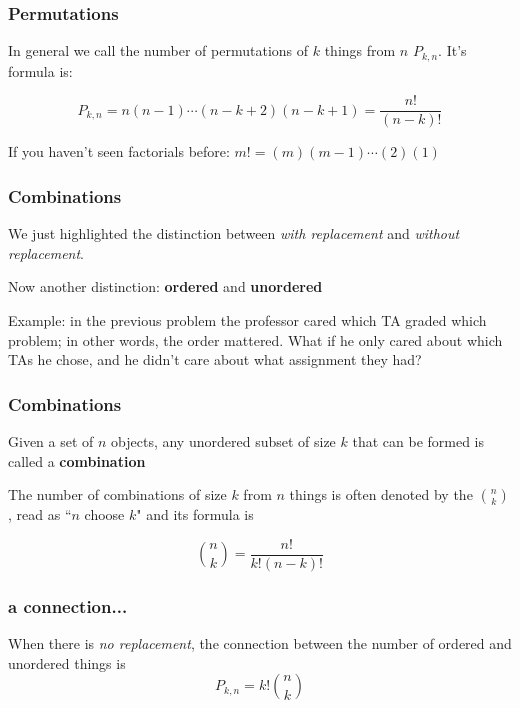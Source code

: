 \begin{frame}
\frametitle{Permutations}

In general we call the number of permutations of $k$ things from $n$ $P_{k,n}$. It's formula is:

\[
P_{k,n} = n(n-1)\cdots(n-k+2)(n-k+1) = \frac{n!}{(n-k)!}
\]

If you haven't seen factorials before: $m! = (m)(m-1)\cdots(2)(1)$
\end{frame}

\begin{frame}
\frametitle{Combinations}

We just highlighted the distinction between \emph{with replacement} and \emph{without replacement}.
\newline

Now another distinction: \textbf{ordered} and \textbf{unordered}
\newline

Example: in the previous problem the professor cared which TA graded which problem; in other words, the order mattered. What if he only cared about which TAs he chose, and he didn't care about what assignment they had?

\end{frame}

\begin{frame}
\frametitle{Combinations}

Given a set of $n$ objects, any unordered subset of size $k$ that can be formed is called a \textbf{combination}
\newline

The number of combinations of size $k$ from $n$ things is often denoted by the ${n \choose k}$, read as ``$n$ choose $k$" and its formula is 

\[
{n \choose k} = \frac{n!}{k!(n-k)!}
\]

\end{frame}

\begin{frame}
\frametitle{a connection...}

When there is \emph{no replacement}, the connection between the number of ordered and unordered things is 
\[
P_{k,n} = k! {n \choose k}
\]

\end{frame}

